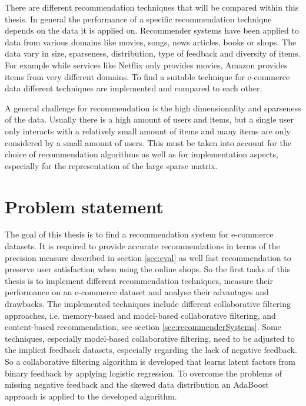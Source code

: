 \documentclass[10pt]{reportMaster}
\begin{document}
There are different recommendation techniques that will be compared within this thesis.
In general the performance of a specific recommendation technique depends on the data it is applied on.
Recommender systems have been applied to data from various domains like movies, songs, news articles, books or shops.
The data vary in size, sparseness, distribution, type of feedback and diversity of items.
For example while services like Netflix only provides movies, Amazon provides items from very different domains.
To find a suitable technique for e-commerce data different techniques are implemented and compared to each other.

A general challenge for recommendation is the high dimensionality and sparseness of the data.
Usually there is a high amount of users and items, but a single user only interacts with a relatively small amount of items and many items are only considered by a small amount of users.
This must be taken into account for the choice of recommendation algorithms as well as for implementation aspects, especially for the representation of the large sparse matrix.


\section{Problem statement}
The goal of this thesis is to find a recommendation system for e-commerce datasets.
It is required to provide accurate recommendations in terms of the precision measure described in section \ref{sec:eval} as well fast recommendation to preserve user satisfaction when using the online shops.
So the first tasks of this thesis is to implement different recommendation techniques, measure their performance on an e-commerce dataset and analyse their advantages and drawbacks.
The implemented techniques include different collaborative filtering approaches, i.e. memory-based and model-based collaborative filtering, and content-based recommendation, see section \ref{sec:recommenderSystems}.
Some techniques, especially model-based collaborative filtering, need to be adjusted to the implicit feedback datasets, especially regarding the lack of negative feedback.
So a collaborative filtering algorithm is developed that learns latent factors from binary feedback by applying logistic regression.
To overcome the problems of missing negative feedback and the skewed data distribution an AdaBoost approach is applied to the developed algorithm.
\end{document}

